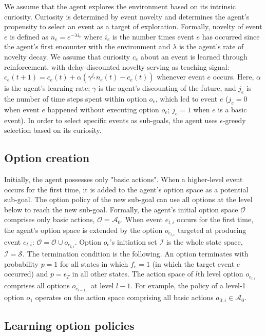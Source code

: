 \documentclass{article}
\begin{document}
We assume that the agent explores the environment based on its intrinsic curiosity. Curiosity is determined by event novelty and determines the agent's propensity to select an event as a target of exploration. Formally, novelty of event $e$ is defined as $n_e = e^{-\lambda i_e}$ where $i_e$ is the number times event $e$ has occurred since the agent's first encounter with the environment and $\lambda$ is the agent's rate of novelty decay. We assume that curiosity $c_e$ about an event is learned through reinforcement, with delay-discounted novelty serving as teaching signal: $c_e(t+1) = c_e(t) + \alpha (\gamma^{j_e} n_e(t) - c_e(t))$ whenever event $e$ occurs. Here, $\alpha$ is the agent's learning rate; $\gamma$ is the agent's discounting of the future, and $j_e$ is the number of time steps spent within option $o_e$, which led to event $e$ ($j_e = 0$ when event $e$ happened without executing option $o_e$; $j_e = 1$ when $e$ is a basic event). In order to select specific events as sub-goals, the agent uses $\epsilon$-greedy selection based on its curiosity.

\subsection{Option creation}

Initially, the agent possesses only "basic actions". When a higher-level event occurs for the first time, it is added to the agent's option space as a potential sub-goal. The option policy of the new sub-goal can use all options at the level below to reach the new sub-goal. Formally, the agent's initial option space $\mathcal{O}$ comprises only basic actions, $\mathcal{O} = \mathcal{A}_0$. When event $e_{l, i}$ occurs for the first time, the agent's option space is extended by the option $o_{e_{l, i}}$ targeted at producing event $e_{l, i}$: $\mathcal{O} = \mathcal{O} \cup o_{e_{l, i}}$. Option $o_e$'s initiation set $\mathcal{I}$ is the whole state space, $\mathcal{I} = \mathcal{S}$. The termination condition is the following. An option terminates with probability $p=1$ for all states in which $f_e = 1$ (in which the target event $e$ occurred) and $p = \epsilon_T$ in all other states. The action space of $l$th level option $o_{e_{l, i}}$ comprises all options $o_{e_{l-1, .}}$ at level $l-1$. For example, the policy of a level-1 option $o_1$ operates on the action space comprising all basic actions $a_{0, i} \in \mathcal{A}_0$. 

\subsection{Learning option policies}
\end{document}
